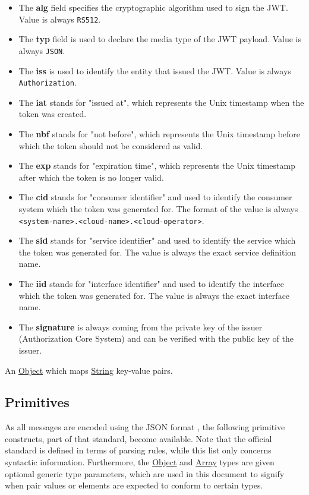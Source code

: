 \documentclass[a4paper]{arrowhead}
\newcommand{\pref}[1]{{\textcolor{ArrowheadGrey}{\hyperref[sec:model:primitives:#1]{#1}}}}
\begin{document}
\begin{itemize}
    \item The \textbf{alg} field specifies the cryptographic algorithm used to sign the JWT. Value is always \texttt{RS512}.
    \item The \textbf{typ} field is used to declare the media type of the JWT payload. Value is always \texttt{JSON}.
    \item The \textbf{iss} is used to identify the entity that issued the JWT. Value is always \texttt{Authorization}.
    \item The \textbf{iat} stands for "issued at", which represents the Unix timestamp when the token was created.
    \item The \textbf{nbf} stands for "not before", which represents the Unix timestamp before which the token should not be considered as valid. 
    \item The \textbf{exp} stands for "expiration time", which represents the Unix timestamp after which the token is no longer valid.
    \item The \textbf{cid} stands for "consumer identifier" and used to identify the consumer system which the token was generated for. The format of the value is always \texttt{<system-name>.<cloud-name>.<cloud-operator>}.
    \item The \textbf{sid} stands for "service identifier" and used to identify the service which the token was generated for. The value is always the exact service definition name.
    \item The \textbf{iid} stands for "interface identifier" and used to identify the interface which the token was generated for. The value is always the exact interface name.
    \item The \textbf{signature} is always coming from the private key of the issuer (Authorization Core System) and can be verified with the public key of the issuer.
\end{itemize}

\label{sec:model:Metadata}

An \pref{Object} which maps \pref{String} key-value pairs.

\newpage

\subsection{Primitives}
\label{sec:model:primitives}

As all messages are encoded using the JSON format \cite{bray2014json}, the following primitive constructs, part of that standard, become available.
Note that the official standard is defined in terms of parsing rules, while this list only concerns syntactic information.
Furthermore, the \pref{Object} and \pref{Array} types are given optional generic type parameters, which are used in this document to signify when pair values or elements are expected to conform to certain types. 
\end{document}
